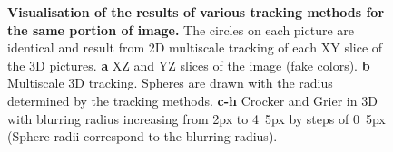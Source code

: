 \begin{figure}
	\caption{\textbf{Visualisation of the results of various tracking methods for the same portion of image.} The circles on each picture are identical and result from 2D multiscale tracking of each XY slice of the 3D pictures. \textbf{a} XZ and YZ slices of the image (fake colors). \textbf{b} Multiscale 3D tracking. Spheres are drawn with the radius determined by the tracking methods. \textbf{c-h} Crocker and Grier in 3D with blurring radius increasing from \unit{2}{px} to \unit{4.5}{px} by steps of \unit{0.5}{px} (Sphere radii correspond to the blurring radius).}
	\label{fig:localise}
\end{figure}
